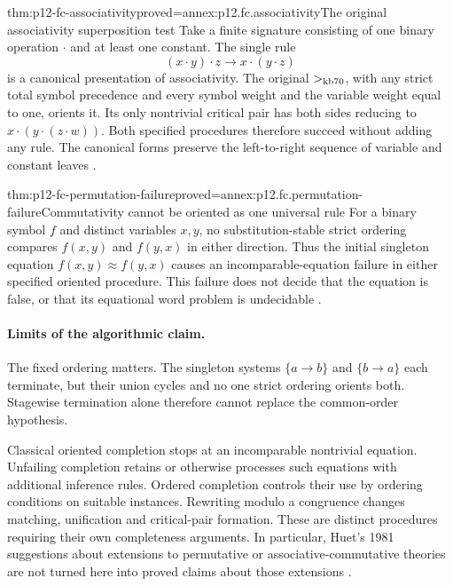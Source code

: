 \begin{hbtheorem}{thm:p12-fc-associativity}{proved=annex:p12.fc.associativity}{The original associativity superposition test}
Take a finite signature consisting of one binary operation
\(\mathbin{\cdot}\) and at least one constant. The single rule
\[
 (x\cdot y)\cdot z\longrightarrow x\cdot(y\cdot z)
\]
is a canonical presentation of associativity. The original
\(>_{\rm kb70}\), with any strict total symbol precedence and
every symbol weight and the variable weight equal to one, orients
it. Its only nontrivial critical pair
has both sides reducing to \(x\cdot(y\cdot(z\cdot w))\).
Both specified procedures therefore succeed without adding any
rule. The canonical forms preserve the left-to-right sequence
of variable and constant leaves \cite[\S5, p.~276]{KnuthBendix1970}.
\end{hbtheorem}

\begin{hbtheorem}{thm:p12-fc-permutation-failure}{proved=annex:p12.fc.permutation-failure}{Commutativity cannot be oriented as one universal rule}
For a binary symbol \(f\) and distinct variables \(x,y\), no
substitution-stable strict ordering compares
\(f(x,y)\) and \(f(y,x)\) in either direction.
Thus the initial singleton equation
\(f(x,y)\approx f(y,x)\) causes an incomparable-equation
failure in either specified oriented procedure. This failure does
not decide that the equation is false, or that its equational
word problem is undecidable \cite[pp.~13--14]{Huet1981CompletionCorrectness}.
\end{hbtheorem}

\paragraph{Limits of the algorithmic claim.}
The fixed ordering matters. The singleton systems \(\{a\to b\}\)
and \(\{b\to a\}\) each terminate, but their union cycles and no
one strict ordering orients both. Stagewise termination alone therefore
cannot replace the common-order hypothesis.

Classical oriented completion stops at an incomparable nontrivial equation.
Unfailing completion retains or otherwise processes such equations with
additional inference rules. Ordered completion controls their use by
ordering conditions on suitable instances. Rewriting modulo a congruence
changes matching, unification and critical-pair formation. These are
distinct procedures requiring their own completeness arguments. In
particular, Huet's 1981 suggestions about extensions to permutative
or associative-commutative theories are not turned here into proved
claims about those extensions \cite[pp.~19--20]{Huet1981CompletionCorrectness}.
